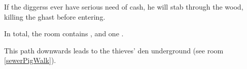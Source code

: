 \begin{multicols}{2}
If the \glspl{diggers} ever have serious need of cash, he will stab through the wood, killing the ghast before entering.


In total, the room contains \lootBig, and one \lootTalisman.

\showTalisman

This path downwards leads to the thieves' den underground (see room \vref{sewerPigWalk}).

\end{multicols}
